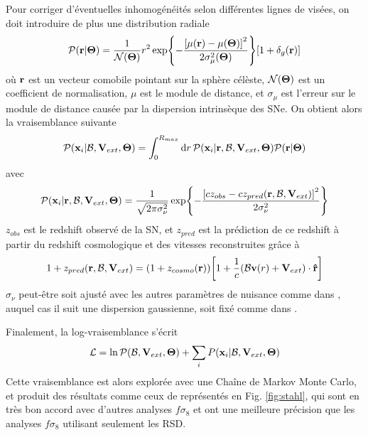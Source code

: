 \documentclass{book}
\let\mcl\mathcal
\begin{document}
Pour corriger d'éventuelles inhomogénéités selon différentes lignes de visées, on doit introduire de plus une distribution radiale
\begin{equation}
    \mcl P(\vb r|\vb \Theta) = \frac{1}{\mcl N(\vb \Theta)} r^2 \exp{- \frac{\qty[\mu(\vb r) - \mu(\vb\Theta)]^2}{2 \sigma_\mu^2(\vb \Theta)}} \qty[1 + \delta_g(\vb r)]
\end{equation}
où $\vb r$ est un vecteur comobile pointant sur la sphère célèste, $\mcl N(\vb \Theta)$ est un coefficient de normalisation, $\mu$ est le module de distance, et $\sigma_\mu$ est l'erreur sur le module de distance causée par la dispersion intrinsèque des SNe. On obtient alors la vraisemblance suivante
\begin{equation}
    \mcl P(\vb x_i|\mcl B, \vb V_{ext}, \vb \Theta) = \int_0^{R_{max}} \dd{r} \mcl P (\vb x_i|\vb r, \mcl B, \vb V_{ext}, \vb \Theta) \mcl P(\vb r|\vb \Theta)
\end{equation}
avec
\begin{equation}
     \mcl P (\vb x_i|\vb r, \mcl B, \vb V_{ext}, \vb \Theta) = \frac{1}{\sqrt{2 \pi \sigma_\nu^2}} \exp{-\frac{\qty[c z_{obs} - cz_{pred}(\vb r, \mcl B, \vb V_{ext})]^2}{2\sigma_\nu^2}}
\end{equation}
$z_{obs}$ est le redshift observé de la SN, et $z_{pred}$ est la prédiction de ce redshift à partir du redshift cosmologique et des vitesses reconstruites grâce à
\begin{equation}
    1 + z_{pred}(\vb r, \mcl B, \vb V_{ext}) = (1 + z_{cosmo}(\vb r)) \qty[1 + \frac{1}{c} (\mcl B \vb v(r) + \vb V_{ext}) \cdot \vu r]
\end{equation}
$\sigma_\nu$ peut-être soit ajusté avec les autres paramètres de nuisance comme dans \cite{stahl_peculiar-velocity_2021}, auquel cas il suit une dispersion gaussienne, soit fixé comme dans \cite{boruah_cosmic_2020}.

Finalement, la log-vraisemblance s'écrit
\begin{equation}
    \mcl L = \ln \mcl P(\mcl B, \vb V_{ext}, \vb \Theta) + \sum_i P(\vb x_i|\mcl B, \vb V_{ext}, \vb \Theta)
\end{equation}
Cette vraisemblance est alors explorée avec une Chaîne de Markov Monte Carlo, et produit des résultats comme ceux de \cite{stahl_peculiar-velocity_2021} représentés en Fig. \ref{fig:stahl}, qui sont en très bon accord avec d'autres analyses $f\sigma_8$ et ont une meilleure précision que les analyses $f\sigma_8$ utilisant seulement les RSD.
\end{document}
